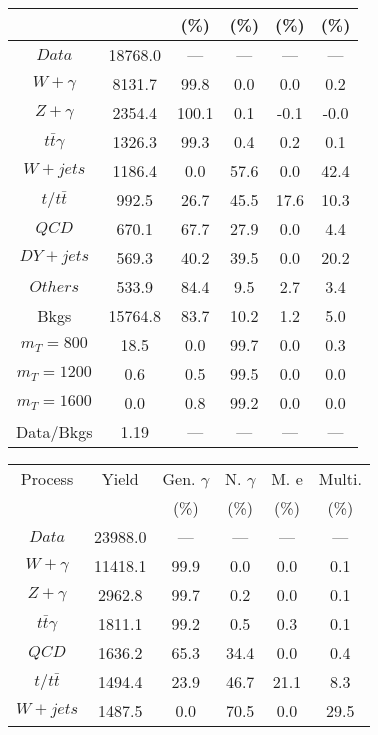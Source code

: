 \begin{figure}
\begin{minipage}[c]{0.32\textwidth}
{\begin{tabular}{cccccc}
 &  & (\%) & (\%) & (\%) & (\%)  \\
\hline
                                                                      $ Data $ &  18768.0 &  --- &  --- &  --- &  ---\\
$ W+\gamma $ &  8131.7 &  99.8 &  0.0 &  0.0 &  0.2\\
$ Z+\gamma $ &  2354.4 &  100.1 &  0.1 &  -0.1 &  -0.0\\
$ t\bar{t}\gamma $ &  1326.3 &  99.3 &  0.4 &  0.2 &  0.1\\
$ W+jets $ &  1186.4 &  0.0 &  57.6 &  0.0 &  42.4\\
$ t/t\bar{t} $ &  992.5 &  26.7 &  45.5 &  17.6 &  10.3\\
$ QCD $ &  670.1 &  67.7 &  27.9 &  0.0 &  4.4\\
$ DY+jets $ &  569.3 &  40.2 &  39.5 &  0.0 &  20.2\\
$ Others $ &  533.9 &  84.4 &  9.5 &  2.7 &  3.4\\
Bkgs &  15764.8 &  83.7 &  10.2 &  1.2 &  5.0\\
$ m_{T} = 800 $ &  18.5 &  0.0 &  99.7 &  0.0 &  0.3\\
$ m_{T} = 1200 $ &  0.6 &  0.5 &  99.5 &  0.0 &  0.0\\
$ m_{T} = 1600 $ &  0.0 &  0.8 &  99.2 &  0.0 &  0.0\\
Data/Bkgs &  1.19 &  --- &  --- &  --- &  ---\\
\hline
\end{tabular}
}
\end{minipage}
\begin{minipage}[c]{0.32\textwidth}
\centering
\tiny{
\begin{tabular}{cccccc}
\hline
Process & Yield & Gen. $\gamma$ & N. $\gamma$ & M. e & Multi. \\
 &  & (\%) & (\%) & (\%) & (\%)  \\
\hline
                                                                      $ Data $ &  23988.0 &  --- &  --- &  --- &  ---\\
$ W+\gamma $ &  11418.1 &  99.9 &  0.0 &  0.0 &  0.1\\
$ Z+\gamma $ &  2962.8 &  99.7 &  0.2 &  0.0 &  0.1\\
$ t\bar{t}\gamma $ &  1811.1 &  99.2 &  0.5 &  0.3 &  0.1\\
$ QCD $ &  1636.2 &  65.3 &  34.4 &  0.0 &  0.4\\
$ t/t\bar{t} $ &  1494.4 &  23.9 &  46.7 &  21.1 &  8.3\\
$ W+jets $ &  1487.5 &  0.0 &  70.5 &  0.0 &  29.5\\

\end{tabular}}
\end{minipage}
\end{figure}
